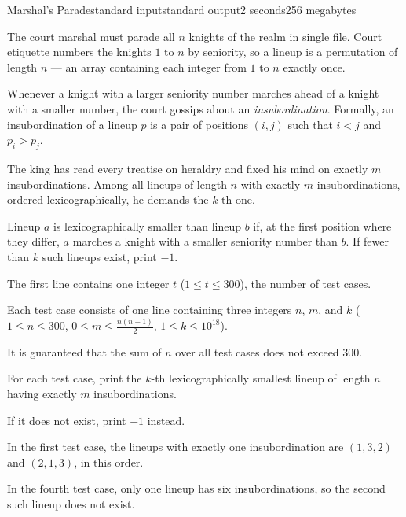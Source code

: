 \begin{problem}{Marshal's Parade}{standard input}{standard output}{2 seconds}{256 megabytes}

The court marshal must parade all $n$ knights of the realm in single file. Court etiquette numbers the knights $1$ to $n$ by seniority, so a lineup is a permutation of length $n$ --- an array containing each integer from $1$ to $n$ exactly once.

Whenever a knight with a larger seniority number marches ahead of a knight with a smaller number, the court gossips about an \emph{insubordination}. Formally, an insubordination of a lineup $p$ is a pair of positions $(i,j)$ such that $i<j$ and $p_i>p_j$.

The king has read every treatise on heraldry and fixed his mind on exactly $m$ insubordinations. Among all lineups of length $n$ with exactly $m$ insubordinations, ordered lexicographically, he demands the $k$-th one.

Lineup $a$ is lexicographically smaller than lineup $b$ if, at the first position where they differ, $a$ marches a knight with a smaller seniority number than $b$.
If fewer than $k$ such lineups exist, print $-1$.


\InputFile
The first line contains one integer $t$ ($1 \le t \le 300$), the number of test cases.

Each test case consists of one line containing three integers $n$, $m$, and $k$ ($1 \le n \le 300$, $0 \le m \le \frac{n(n-1)}{2}$, $1 \le k \le 10^{18}$).

It is guaranteed that the sum of $n$ over all test cases does not exceed $300$.


\OutputFile
For each test case, print the $k$-th lexicographically smallest lineup of length $n$ having exactly $m$ insubordinations.

If it does not exist, print $-1$ instead.


\Examples

\begin{example}
%
%
\end{example}

\Note
In the first test case, the lineups with exactly one insubordination are $(1,3,2)$ and $(2,1,3)$, in this order.

In the fourth test case, only one lineup has six insubordinations, so the second such lineup does not exist.


\end{problem}

